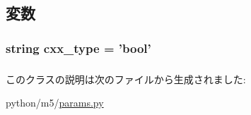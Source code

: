 \subsection{変数}
\hypertarget{classm5_1_1params_1_1Bool_a2f1553ebb79374a68b36fdd6d8d82fc3}{
\subsubsection[{cxx\_\-type}]{\setlength{\rightskip}{0pt plus 5cm}string {\bf cxx\_\-type} = 'bool'}}
\label{classm5_1_1params_1_1Bool_a2f1553ebb79374a68b36fdd6d8d82fc3}
\hypertarget{classm5_1_1params_1_1Bool_afcc7a4b78ecd8fa7e713f8cfa0f51017}{
\subsubsection[{value}]{}}
\label{classm5_1_1params_1_1Bool_afcc7a4b78ecd8fa7e713f8cfa0f51017}


このクラスの説明は次のファイルから生成されました:\begin{DoxyCompactItemize}
\item 
python/m5/\hyperlink{params_8py}{params.py}\end{DoxyCompactItemize}
